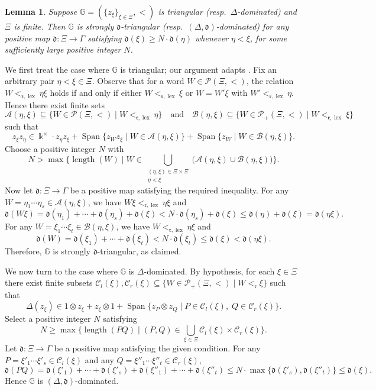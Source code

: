 \documentclass{article}
\makeatletter
\renewenvironment{proof}[1][\proofname]{\par
	\pushQED{\qed}%
	\normalfont \topsep6\p@\@plus6\p@\relax
	\trivlist
	\item[\hskip\labelsep
	\bfseries
	#1\@addpunct{.}]\ignorespaces
}{%
	\popQED\endtrivlist\@endpefalse
}
\theoremstyle{plain}
\newtheorem{lemma}[thm]{Lemma}
\theoremstyle{definition}
\numberwithin{equation}{section}
\DeclareMathOperator{\Span}{Span}
\DeclareMathOperator{\lex}{lex}
\newcommand{\PP}{\mathcal{P}}
\newcommand{\GG}{\mathbb{G}}
\newcommand{\dd}{\mathfrak{d}}
\newcommand{\rr}{\mathfrak{r}}
\makeatother
\begin{document}
	\begin{lemma}\label{triangular-construct}
		Suppose $\GG=(\{z_\xi\}_{\xi \in\Xi},<)$ is triangular (resp.\ $\Delta$-dominated) and $\Xi$ is finite. Then $\GG$ is strongly $\dd$-triangular (resp.\ $(\Delta,\dd)$-dominated) for any positive map $\dd\colon\Xi\to \Gamma$ satisfying $\dd(\xi)\geq N\cdot \dd(\eta)$ whenever $\eta < \xi$, for some sufficiently large positive integer $N$.
	\end{lemma}
	\begin{proof}
		We first treat the case where $\GG$ is triangular; our argument adapts \cite[Subsection 5.1]{BZ22}. Fix an arbitrary pair $\eta< \xi \in \Xi$. Observe that for a word $W\in \PP(\Xi,<)$, the relation $W<_{\rr,\lex} \eta \xi$ holds if and only if either $W<_{\rr,\lex} \xi$ or $W=W'\xi$ with $W' <_{\rr,\lex} \eta$. Hence there exist finite sets
		\[
		\mathcal{A}(\eta,\xi) \subseteq \{W\in \PP(\Xi, <) \mid W <_{\rr,\lex} \eta\}
		\quad \text{and} \quad
		\mathcal{B}(\eta,\xi) \subseteq \{W\in \PP_{+}(\Xi, <) \mid W <_{\rr,\lex} \xi\}
		\]
		such that
		\[
		z_\xi z_\eta \in \Bbbk^{\times} \cdot z_\eta z_\xi + \Span\{z_{W}z_{\xi} \mid W \in \mathcal{A}(\eta,\xi)\} + \Span\{z_{W} \mid W \in \mathcal{B}(\eta,\xi)\}.
		\]
		Choose a positive integer $N$ with
		\[
		N > \max\big\{ \operatorname{length}(W) \;\big|\; W\in \bigcup_{ \substack{(\eta,\xi) \in \Xi\times \Xi \\ \eta < \xi}} \big( \mathcal{A}(\eta,\xi) \cup \mathcal{B}(\eta,\xi) \big) \big\}.
		\]
		Now let $\dd\colon \Xi\to \Gamma$ be a positive map satisfying the required inequality. For any $W =\eta_{1}\cdots \eta_{s} \in \mathcal{A}(\eta,\xi)$, we have $W\xi <_{\rr,\lex} \eta\xi$ and
		\[
		\dd(W\xi) = \dd(\eta_{1}) +\cdots + \dd(\eta_{s})  +\dd(\xi) < N\cdot  \dd(\eta_{s})  +\dd(\xi) \leq \dd(\eta)  +\dd(\xi)=\dd(\eta\xi).
		\]
		For any $W=\xi_{1}\cdots \xi_{t} \in \mathcal{B}(\eta,\xi)$, we have $W <_{\rr,\lex} \eta\xi$ and
		\[
		\dd(W) = \dd(\xi_{1}) +\cdots +\dd(\xi_{t}) < N\cdot \dd(\xi_{t}) \leq \dd(\xi) < \dd(\eta\xi).
		\]
		Therefore, $\GG$ is strongly $\dd$-triangular, as claimed.
		
		We now turn to the case where $\GG$ is $\Delta$-dominated. By hypothesis, for each $\xi\in \Xi$ there exist finite subsets $\mathcal{C}_{l}(\xi), \mathcal{C}_{r}(\xi) \subseteq \{W\in \PP_{+}(\Xi,<) \mid W <_{\rr} \xi\}$ such that
		\[
		\Delta(z_{\xi}) \in 1\otimes z_{\xi} +z_{\xi} \otimes 1 + \Span\{z_{P}\otimes z_{Q} \mid P\in \mathcal{C}_{l}(\xi),\; Q \in  \mathcal{C}_{r}(\xi)\}.
		\]
		Select a positive integer $N$ satisfying
		\[
		N\geq \max\big\{ \operatorname{length}(PQ) \;\big|\;  (P,Q) \in \bigcup_{\xi\in \Xi} \mathcal{C}_{l}(\xi) \times \mathcal{C}_{r}(\xi) \big\}.
		\]
		Let $\dd\colon \Xi\to \Gamma$ be a positive map satisfying the given condition. For any $P=\xi'_{1}\cdots \xi'_{s} \in \mathcal{C}_{l}(\xi)$ and any $Q=\xi''_{1}\cdots \xi''_{t} \in \mathcal{C}_{r}(\xi)$,
		\[
		\dd(PQ) = \dd(\xi'_{1}) +\cdots + \dd(\xi'_{s}) + \dd(\xi''_{1}) +\cdots +\dd(\xi''_{t}) \leq N\cdot \max\{\dd(\xi'_{s}), \dd(\xi''_{t})\} \leq \dd(\xi).
		\]
		Hence $\GG$ is $(\Delta, \dd)$-dominated.
	\end{proof}
	
\end{document}
